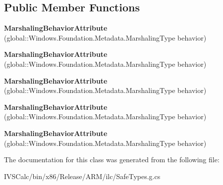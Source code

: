 \subsection*{Public Member Functions}
\begin{DoxyCompactItemize}
\item 
\mbox{\label{class_windows_1_1_foundation_1_1_metadata_1_1_marshaling_behavior_attribute_aa75858c90c36a64ca7557ee5d01e3330}} 
{\bfseries Marshaling\+Behavior\+Attribute} (global\+::\+Windows.\+Foundation.\+Metadata.\+Marshaling\+Type behavior)
\item 
\mbox{\label{class_windows_1_1_foundation_1_1_metadata_1_1_marshaling_behavior_attribute_aa75858c90c36a64ca7557ee5d01e3330}} 
{\bfseries Marshaling\+Behavior\+Attribute} (global\+::\+Windows.\+Foundation.\+Metadata.\+Marshaling\+Type behavior)
\item 
\mbox{\label{class_windows_1_1_foundation_1_1_metadata_1_1_marshaling_behavior_attribute_aa75858c90c36a64ca7557ee5d01e3330}} 
{\bfseries Marshaling\+Behavior\+Attribute} (global\+::\+Windows.\+Foundation.\+Metadata.\+Marshaling\+Type behavior)
\item 
\mbox{\label{class_windows_1_1_foundation_1_1_metadata_1_1_marshaling_behavior_attribute_aa75858c90c36a64ca7557ee5d01e3330}} 
{\bfseries Marshaling\+Behavior\+Attribute} (global\+::\+Windows.\+Foundation.\+Metadata.\+Marshaling\+Type behavior)
\item 
\mbox{\label{class_windows_1_1_foundation_1_1_metadata_1_1_marshaling_behavior_attribute_aa75858c90c36a64ca7557ee5d01e3330}} 
{\bfseries Marshaling\+Behavior\+Attribute} (global\+::\+Windows.\+Foundation.\+Metadata.\+Marshaling\+Type behavior)
\end{DoxyCompactItemize}


The documentation for this class was generated from the following file\+:\begin{DoxyCompactItemize}
\item 
I\+V\+S\+Calc/bin/x86/\+Release/\+A\+R\+M/ilc/Safe\+Types.\+g.\+cs\end{DoxyCompactItemize}
